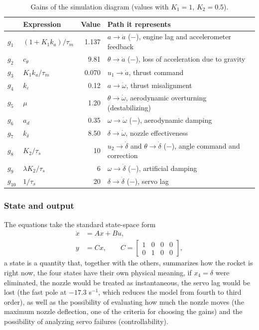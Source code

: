 \documentclass[article, 11pt]{IEEEtran}   %
\begin{document}
\begin{table}[!t]
\centering\footnotesize\setlength{\tabcolsep}{3pt}
\caption{Gains of the simulation diagram (values with $K_1=1$, $K_2=0.5$).}\label{tab:g}
\begin{tabular}{llrp{3.3cm}}
\toprule
 & Expression & Value & Path it represents\\
\midrule
$g_1$ & $(1+K_1k_a)/\tau_m$ & 1.137 & $a\to\dot a$ ($-$), engine lag and accelerometer feedback\\
$g_2$ & $c_\theta$ & 9.81 & $\theta\to\dot a$ ($-$), loss of acceleration due to gravity\\
$g_3$ & $K_1k_a/\tau_m$ & 0.070 & $u_1\to\dot a$, thrust command\\
$g_4$ & $k_\varepsilon$ & 0.12 & $a\to\dot\omega$, thrust misalignment\\
$g_5$ & $\mu$ & 1.20 & $\theta\to\dot\omega$, aerodynamic overturning (destabilizing)\\
$g_6$ & $a_d$ & 0.35 & $\omega\to\dot\omega$ ($-$), aerodynamic damping\\
$g_7$ & $k_\delta$ & 8.50 & $\delta\to\dot\omega$, nozzle effectiveness\\
$g_8$ & $K_2/\tau_s$ & 10 & $u_2\to\dot\delta$ and $\theta\to\dot\delta$ ($-$), angle command and correction\\
$g_9$ & $\lambda K_2/\tau_s$ & 6 & $\omega\to\dot\delta$ ($-$), artificial damping\\
$g_{10}$ & $1/\tau_s$ & 20 & $\delta\to\dot\delta$ ($-$), servo lag\\
\bottomrule
\end{tabular}
\end{table}

\subsubsection{State and output}
The equations take the standard state-space form
\begin{align}
\dot x&=Ax+Bu,\\
y&=Cx,\qquad C=\begin{bmatrix}1&0&0&0\\0&1&0&0\end{bmatrix},
\end{align}
a state is a quantity that, together with the others, summarizes how the rocket is right now, the four states have their own physical meaning, if $x_4=\delta$ were eliminated, the nozzle would be treated as instantaneous, the servo lag would be lost (the fast pole at $-17.3$ s$^{-1}$, which reduces the model from fourth to third order), as well as the possibility of evaluating how much the nozzle moves (the maximum nozzle deflection, one of the criteria for choosing the gains) and the possibility of analyzing servo failures (controllability).
\end{document}
